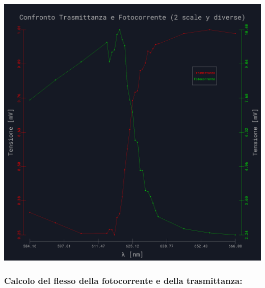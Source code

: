 \documentclass{article}
\begin{document}
\begin{center}
    \begin{minipage}{0.4\textwidth} %
        \centering
        \includegraphics[width=1\linewidth]{../images/grafico16.png} %
        \label{grafico:16}
    \end{minipage}    
\end{center}

\subsubsection{Calcolo del flesso della fotocorrente e della trasmittanza:}
\end{document}
